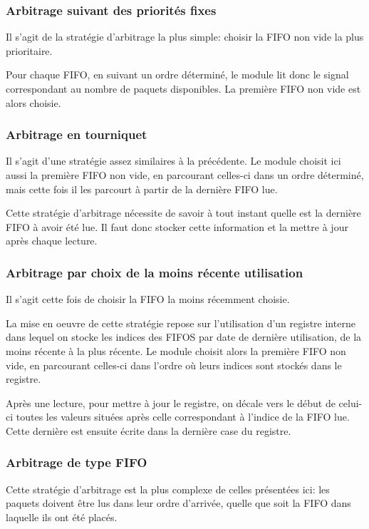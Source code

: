 \documentclass[11pt]{article}
\begin{document}
\subsubsection{Arbitrage suivant des priorités fixes}
Il s'agit de la stratégie d'arbitrage la plus simple: choisir la FIFO non vide la plus prioritaire.

Pour chaque FIFO, en suivant un ordre déterminé, le module lit donc le signal correspondant au nombre de paquets disponibles.
La première FIFO non vide est alors choisie.

\subsubsection{Arbitrage en tourniquet}
Il s'agit d'une stratégie assez similaires à la précédente.
Le module choisit ici aussi la première FIFO non vide, en parcourant celles-ci dans un ordre déterminé,
mais cette fois il les parcourt à partir de la dernière FIFO lue.

Cette stratégie d'arbitrage nécessite de savoir à tout instant quelle est la dernière FIFO à avoir été lue.
Il faut donc stocker cette information et la mettre à jour après chaque lecture.

\subsubsection{Arbitrage par choix de la moins récente utilisation}
Il s'agit cette fois de choisir la FIFO la moins récemment choisie.

La mise en oeuvre de cette stratégie repose sur l'utilisation d'un registre interne
dans lequel on stocke les indices des FIFOS par date de dernière utilisation, de la moins récente à la plus récente.
Le module  choisit alors la première FIFO non vide, en parcourant celles-ci dans l'ordre où leurs indices sont stockés dans le registre.

Après une lecture, pour mettre à jour le registre, on décale vers le début de celui-ci toutes les valeurs situées après celle correspondant à l'indice de la FIFO lue.
Cette dernière est ensuite écrite dans la dernière case du registre.

\subsubsection{Arbitrage de type FIFO}
Cette stratégie d'arbitrage est la plus complexe de celles présentées ici:
les paquets doivent être lus dans leur ordre d'arrivée, quelle que soit
la FIFO dans laquelle ils ont été placés.
\end{document}
